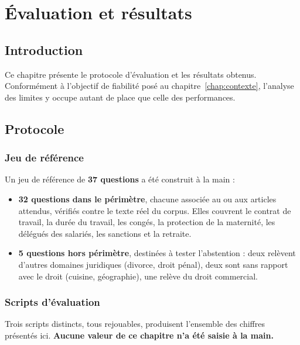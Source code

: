 \chapter{Évaluation et résultats}
\label{chap:evaluation}

\section*{Introduction}

Ce chapitre présente le protocole d'évaluation et les résultats obtenus. Conformément à
l'objectif de fiabilité posé au chapitre~\ref{chap:contexte}, l'analyse des limites y occupe
autant de place que celle des performances.

\section{Protocole}

\subsection{Jeu de référence}

Un jeu de référence de \textbf{37 questions} a été construit à la main :

\begin{itemize}
    \item \textbf{32 questions dans le périmètre}, chacune associée au ou aux articles attendus,
    vérifiés contre le texte réel du corpus. Elles couvrent le contrat de travail, la durée du
    travail, les congés, la protection de la maternité, les délégués des salariés, les sanctions
    et la retraite.
    \item \textbf{5 questions hors périmètre}, destinées à tester l'abstention : deux relèvent
    d'autres domaines juridiques (divorce, droit pénal), deux sont sans rapport avec le droit
    (cuisine, géographie), une relève du droit commercial.
\end{itemize}

\subsection{Scripts d'évaluation}

Trois scripts distincts, tous rejouables, produisent l'ensemble des chiffres présentés ici.
\textbf{Aucune valeur de ce chapitre n'a été saisie à la main.}

